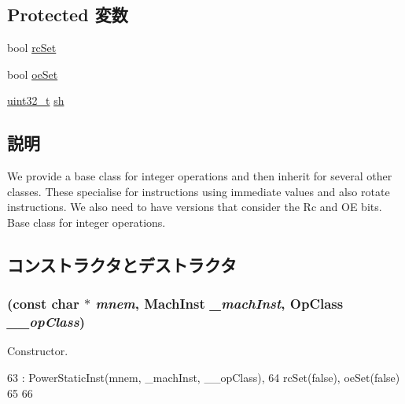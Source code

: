 \subsection*{Protected 変数}
\begin{DoxyCompactItemize}
\item 
bool \hyperlink{classPowerISA_1_1IntOp_abfffe0b446d6f9419bdf9e72c73741fc}{rcSet}
\item 
bool \hyperlink{classPowerISA_1_1IntOp_af9dda19aeb854a1287c78dcd042af18a}{oeSet}
\item 
\hyperlink{Type_8hh_a435d1572bf3f880d55459d9805097f62}{uint32\_\-t} \hyperlink{classPowerISA_1_1IntOp_a2b6cd065d4330a52705b9237b1062c6a}{sh}
\end{DoxyCompactItemize}


\subsection{説明}
We provide a base class for integer operations and then inherit for several other classes. These specialise for instructions using immediate values and also rotate instructions. We also need to have versions that consider the Rc and OE bits. Base class for integer operations. 

\subsection{コンストラクタとデストラクタ}
\hypertarget{classPowerISA_1_1IntOp_a717c06097161d221442d17dca50982db}{
\subsubsection[{IntOp}]{ (const char $\ast$ {\em mnem}, \/  {\bf MachInst} {\em \_\-machInst}, \/  OpClass {\em \_\-\_\-opClass})}}
\label{classPowerISA_1_1IntOp_a717c06097161d221442d17dca50982db}


Constructor. 


\begin{DoxyCode}
63       : PowerStaticInst(mnem, _machInst, __opClass),
64         rcSet(false), oeSet(false)
65     {
66     }
\end{DoxyCode}



